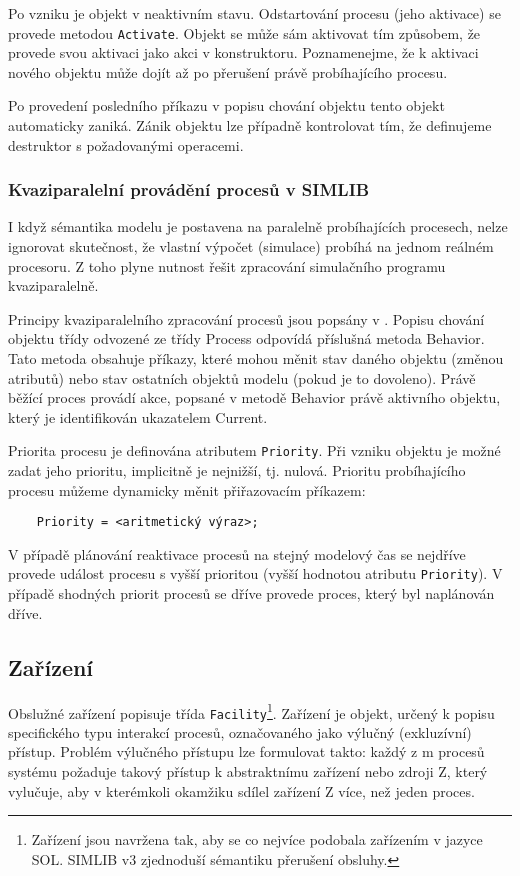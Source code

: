 \documentclass[a4paper]{article}
\begin{document}
Po vzniku je objekt v neaktivním stavu. Odstartování procesu
(jeho aktivace) se provede metodou \verb|Activate|. Objekt se může sám
aktivovat tím způsobem, že provede svou aktivaci jako akci
v konstruktoru. Poznamenejme, že k aktivaci nového objektu může
dojít až po přerušení právě probíhajícího procesu.

Po provedení posledního příkazu v popisu chování objektu tento
objekt automaticky zaniká. Zánik objektu lze případně
kontrolovat tím, že definujeme destruktor s požadovanými
operacemi.


\subsubsection{Kvaziparalelní provádění procesů v SIMLIB}

I když sémantika modelu je postavena na paralelně probíhajících
procesech, nelze ignorovat skutečnost, že vlastní výpočet
(simulace) probíhá na jednom reálném procesoru. Z toho plyne
nutnost řešit zpracování simulačního programu kvaziparalelně.

Principy kvaziparalelního zpracování procesů jsou popsány
v \cite{Skripta92}. Popisu chování objektu třídy odvozené ze třídy
Process odpovídá příslušná metoda Behavior. Tato metoda obsahuje
příkazy, které mohou měnit stav daného objektu (změnou atributů)
nebo stav ostatních objektů modelu (pokud je to dovoleno). Právě
běžící proces provádí akce, popsané v metodě Behavior právě
aktivního objektu, který je identifikován ukazatelem Current.

Priorita procesu je definována atributem \verb|Priority|. Při vzniku
objektu je možné zadat jeho prioritu, implicitně je nejnižší,
tj. nulová. Prioritu probíhajícího procesu můžeme dynamicky
měnit přiřazovacím příkazem:

\begin{verbatim}
    Priority = <aritmetický výraz>;
\end{verbatim}

V případě plánování reaktivace procesů na stejný modelový čas se
nejdříve provede událost procesu s vyšší prioritou (vyšší
hodnotou atributu \verb|Priority|). V případě shodných priorit procesů
se dříve provede proces, který byl naplánován dříve.


\subsection{Zařízení}

Obslužné zařízení popisuje třída \verb|Facility|\footnote{Zařízení jsou
navržena tak, aby se co nejvíce podobala zařízením v jazyce SOL. SIMLIB v3
zjednoduší sémantiku přerušení obsluhy.}. Zařízení je
objekt, určený k popisu specifického typu interakcí procesů, označovaného
jako výlučný (exkluzívní) přístup. Problém výlučného přístupu lze formulovat
takto: každý z m procesů systému požaduje takový přístup k abstraktnímu
zařízení nebo zdroji Z, který vylučuje, aby v kterémkoli okamžiku sdílel
zařízení Z více, než jeden proces.
\end{document}
